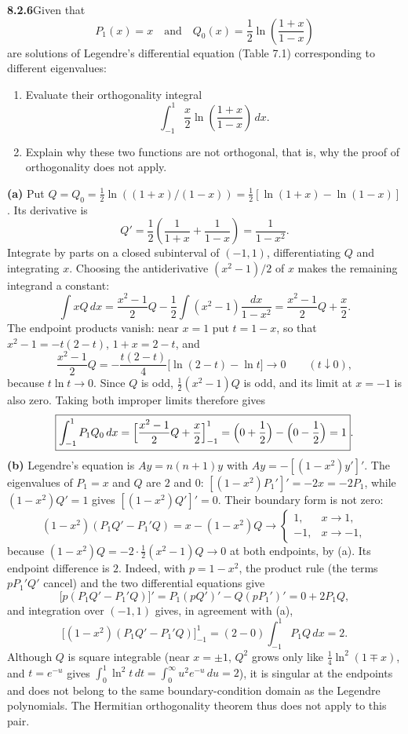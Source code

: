 \par\bigskip
\noindent\textbf{8.2.6}\quad Given that
\[
P_{1}(x)=x\quad\text{and}\quad
Q_{0}(x)=\frac{1}{2}\ln\left(\frac{1+x}{1-x}\right)
\]
are solutions of Legendre's differential equation (Table 7.1) corresponding to
different eigenvalues:
\begin{enumerate}
\item[(a)] Evaluate their orthogonality integral
  \[
  \int_{-1}^{1}\frac{x}{2}\ln\left(\frac{1+x}{1-x}\right)\,dx.
  \]
\item[(b)] Explain why these two functions are not orthogonal, that is, why
  the proof of orthogonality does not apply.
\end{enumerate}
\solution
\textbf{(a)} Put
$Q=Q_0=\tfrac12\ln((1+x)/(1-x))=\tfrac12[\ln(1+x)-\ln(1-x)]$.
Its derivative is
\[
Q'=\frac12\left(\frac1{1+x}+\frac1{1-x}\right)
=\frac1{1-x^2}.
\]
Integrate by parts on a closed subinterval of $(-1,1)$, differentiating
$Q$ and integrating $x$.  Choosing the antiderivative $(x^2-1)/2$ of
$x$ makes the remaining integrand a constant:
\[
\int xQ\,dx=\frac{x^2-1}{2}Q
-\frac12\int(x^2-1)\frac{dx}{1-x^2}
=\frac{x^2-1}{2}Q+\frac{x}{2}.
\]
The endpoint products vanish: near $x=1$ put $t=1-x$, so that
$x^2-1=-t(2-t)$, $1+x=2-t$, and
\[
\frac{x^2-1}{2}Q=-\frac{t(2-t)}{4}\bigl[\ln(2-t)-\ln t\bigr]
\longrightarrow0\qquad(t\downarrow0),
\]
because $t\ln t\to0$.  Since $Q$ is odd, $\frac12(x^2-1)Q$ is odd,
and its limit at $x=-1$ is also zero.
Taking both improper limits therefore gives
\[
\boxed{\int_{-1}^{1}P_1Q_0\,dx
=\Bigl[\frac{x^2-1}{2}Q+\frac x2\Bigr]_{-1}^{1}
=\Bigl(0+\frac12\Bigr)-\Bigl(0-\frac12\Bigr)=1}.
\]
\textbf{(b)} Legendre's equation is $Ay=n(n+1)y$ with
$Ay=-[(1-x^2)y']'$.  The eigenvalues of $P_1=x$ and $Q$ are $2$ and
$0$: $[(1-x^2)P_1']'=-2x=-2P_1$, while $(1-x^2)Q'=1$ gives
$[(1-x^2)Q']'=0$.  Their boundary form is not zero:
\[
(1-x^2)(P_1Q'-P_1'Q)
=x-(1-x^2)Q\longrightarrow
\begin{cases}1,&x\to1,\\-1,&x\to-1,\end{cases}
\]
because $(1-x^2)Q=-2\cdot\frac12(x^2-1)Q\to0$ at both endpoints, by (a).
Its endpoint difference is $2$.  Indeed, with $p=1-x^2$, the product
rule (the terms $pP_1'Q'$ cancel) and the two differential equations
give
\[
\bigl[p(P_1Q'-P_1'Q)\bigr]'=P_1(pQ')'-Q(pP_1')'=0+2P_1Q,
\]
and integration over $(-1,1)$ gives, in agreement with (a),
\[
\bigl[(1-x^2)(P_1Q'-P_1'Q)\bigr]_{-1}^{1}
=(2-0)\int_{-1}^{1}P_1Q\,dx=2.
\]
Although $Q$ is square integrable (near $x=\pm1$, $Q^2$ grows only
like $\frac14\ln^2(1\mp x)$, and $t=e^{-u}$ gives
$\int_0^1\ln^2t\,dt=\int_0^\infty u^2e^{-u}\,du=2$), it is
singular at the endpoints and
does not belong to the same boundary-condition domain as the Legendre
polynomials.  The Hermitian orthogonality theorem thus does not apply
to this pair.


